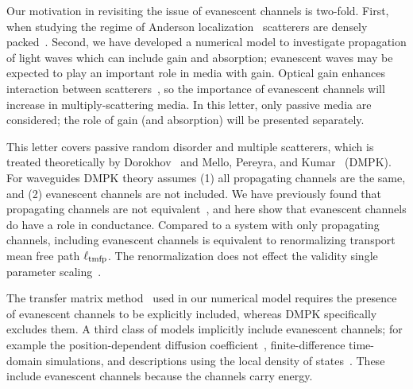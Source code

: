 Our motivation in revisiting the issue of evanescent channels is two-fold. First, when studying the regime of Anderson localization~\cite{1958_Anderson,2009_Lagendijk_PT,2010_Abrahams} scatterers are densely packed~\cite{1960_Ioffe_criterion}. Second, we have developed a numerical model to investigate propagation of light waves which can include gain and absorption; evanescent waves may be expected to play an important role in media with gain.
Optical gain enhances interaction between scatterers~\cite{2006_Heinrichs,1997_Heinrichs}, so the importance of evanescent channels will increase in multiply-scattering media. In this letter, only passive media are considered; the role of gain (and absorption) will be presented separately. 


This letter covers passive random disorder and multiple scatterers, which is treated theoretically by Dorokhov~\cite{1982_Dorokhov_DMPK} and Mello, Pereyra, and Kumar~\cite{1988_Mello_Kumar_DMPK} (DMPK). For waveguides DMPK theory assumes (1) all propagating channels are the same, %
 and (2) evanescent channels are not included. %
We have previously found that propagating channels are not equivalent~\cite{2008_Yamilov_PRB}, and here show that evanescent channels do have a role in conductance. Compared to a system with only propagating channels, including evanescent channels is equivalent to renormalizing transport mean free path $\ell_{\rm tmfp}$. The renormalization does not effect the validity single parameter scaling~\cite{1979_Anderson}.

The transfer matrix method~\cite{1981_MacKinnon_scaling,1992_Pendry,2003_Kettemann} used in our numerical model requires the presence of evanescent channels to be explicitly included, whereas DMPK specifically excludes them. A third class of models implicitly include evanescent channels; for example the position-dependent diffusion coefficient~\cite{2000_van_Tiggelen,2007_Skipetrov}, finite-difference time-domain simulations, and descriptions using the local density of states~\cite{2006_vanTiggelen,2010_Mosk_Skipetrov_PRL,2002_Chicanne}. These include evanescent channels because the channels carry energy.

